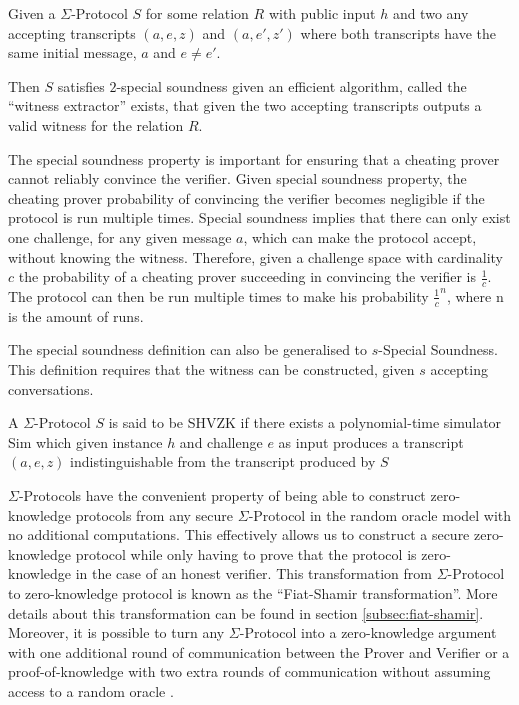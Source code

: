 \begin{definition}
Given a $\Sigma$-Protocol $S$ for some relation $R$ with public input $h$
and two any accepting transcripts $(a,e,z)$ and $(a,e',z')$
where both transcripts have the same initial message, $a$ and $e \neq e'$.

Then $S$ satisfies $2$-special soundness given an efficient
algorithm, called the ``witness extractor'' exists, that
given the two accepting transcripts outputs a valid witness for the relation $R$.
\end{definition}

The special soundness property is important for ensuring that a cheating prover
cannot reliably convince the verifier.
Given special soundness property, the cheating prover probability of convincing
the verifier becomes negligible if the protocol is run multiple times.
Special soundness implies that there can
only exist one challenge, for any given message $a$, which can make the
protocol accept, without knowing the witness. Therefore, given a challenge space
with cardinality $c$ the probability of a cheating prover succeeding in
convincing the verifier is $\frac{1}{c}$. The protocol can then be run multiple
times to make his probability $\frac{1}{c}^{n}$, where n is the amount of runs.

The special soundness definition can also be generalised to $s$-Special
Soundness. This definition requires that the witness can be constructed, given
$s$ accepting conversations.

\begin{definition}
  A $\Sigma$-Protocol $S$ is said to be SHVZK if there exists a polynomial-time
  simulator Sim which given instance $h$ and challenge $e$ as input produces a
  transcript $(a,e,z)$ indistinguishable from the transcript produced by $S$
\end{definition}

$\Sigma$-Protocols have the convenient property of being able to construct
zero-knowledge protocols from any secure $\Sigma$-Protocol in the random oracle
model with no additional computations. This effectively allows us to construct a
secure zero-knowledge protocol while only having to prove that the protocol is
zero-knowledge in the case of an honest verifier. This transformation from
$\Sigma$-Protocol to zero-knowledge protocol is known as the ``Fiat-Shamir
transformation''. More details about this transformation can be found in section
\ref{subsec:fiat-shamir}.
Moreover, it is possible to turn any $\Sigma$-Protocol into a zero-knowledge
argument with one additional round of communication between the Prover and
Verifier or a proof-of-knowledge with two extra rounds of communication without
assuming access to a random oracle \cite{on-sigma-protocols}.


